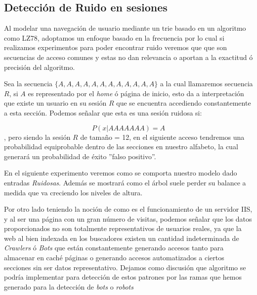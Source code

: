 


\subsection{Detección de Ruido en sesiones}

Al modelar una navegación de usuario mediante un trie basado en un algoritmo como LZ78, adoptamos un enfoque basado en la frecuencia por lo cual si realizamos experimentos para poder encontrar ruido veremos que que son secuencias de acceso comunes y estas no dan relevancia o aportan a la exactitud ó precisión del algoritmo.

Sea la secuencia $\{A,A,A,A,A,A,A,A,A,A,A,A \}$ a la cual llamaremos secuencia $R$, si $A$ es representado por el \emph{home} ó página de inicio, esto da a interpretación que existe un usuario en su sesión $R$ que se encuentra accediendo constantemente a esta sección. Podemos señalar que esta es una sesión ruidosa si:

\begin{equation}
	P( x | AAAAAAA)= A	
\end{equation}, pero siendo la sesión $R$ de tamaño = 12, en el siguiente acceso tendremos una probabilidad equiprobable dentro de las secciones en nuestro alfabeto, la cual generará un probabilidad de éxito ''falso positivo''.

En el siguiente experimento veremos como se comporta nuestro modelo dado entradas \emph{Ruidosas}. Además se mostrará como el árbol suele perder su balance a medida que va creciendo los niveles de altura. 



Por otro lado teniendo la noción de como es el funcionamiento de un servidor IIS, y al ser una página con un gran número de visitas, podemos señalar que los datos proporcionados no son totalmente representativos de usuarios reales, ya que la web al bien indexada en los buscadores existen un cantidad indeterminada de \emph{Crawlers} ó \emph{Bots} que están constantemente generando accesos tanto para almacenar en caché páginas o generando accesos automatizados a ciertos secciones sin ser datos representativo. Dejamos como discusión que algoritmo se podría implementar para detección de estos patrones por las ramas que hemos generado para la detección de \emph{bots} o \emph{robots}



